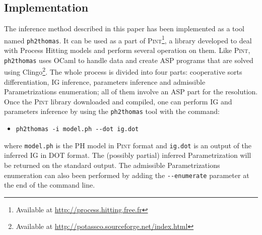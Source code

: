 \subsection{Implementation}
The inference method described in this paper has been implemented as a tool named \texttt{ph2thomas}. It can be used as a part of \textsc{Pint}\footnote{Available at \url{http://process.hitting.free.fr}}, a library developed to deal with Process Hitting models and perform several operation on them.
Like \textsc{Pint}, \texttt{ph2thomas} uses OCaml to handle data and create ASP programs that are solved using Clingo\footnote{Available at \url{http://potassco.sourceforge.net/index.html}}.
The whole process is divided into four parts: cooperative sorts differentiation, IG inference, parameters inference and admissible Parametrizations enumeration; all of them involve an ASP part for the resolution.
Once the \textsc{Pint} library downloaded and compiled, one can perform IG and parameters inference by using the \texttt{ph2thomas} tool with the command:
\begin{itemize}
  \item[] \texttt{ph2thomas -i model.ph -{}-dot ig.dot}
\end{itemize}
where \texttt{model.ph} is the PH model in \textsc{Pint} format and \texttt{ig.dot} is an output of the inferred IG in DOT format.
The (possibly partial) inferred Parametrization will be returned on the standard output.
The admissible Parametrizations enumeration can also been performed by adding the \texttt{-{}-enumerate} parameter at the end of the command line.

